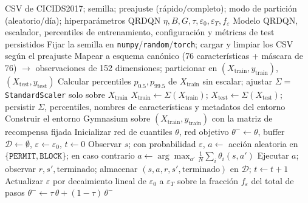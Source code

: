 \begin{algorithm}[htbp]
\caption[Entrenamiento del defensor QRDQN]{Entrenamiento del agente defensor QRDQN sobre CICIDS2017: carga y limpieza de datos, mapeo canónico, partición train/test, ajuste del escalador exclusivamente sobre train, bucle de entrenamiento QRDQN con $\gamma=0$ y persistencia de artefactos. Fuente: elaboración propia a partir de \texttt{src/train\_rl\_defender.py}.}
\label{alg:entrenamiento-qrdqn}
\footnotesize
\begin{algorithmic}[1]
\Require CSV de CICIDS2017; semilla; preajuste (rápido/completo); modo de partición (aleatorio/día); hiperparámetros QRDQN $\eta, B, G, \tau, \varepsilon_0, \varepsilon_T, f_\varepsilon$
\Ensure Modelo QRDQN, escalador, percentiles de entrenamiento, configuración y métricas de test persistidos
\State Fijar la semilla en \texttt{numpy}/\texttt{random}/\texttt{torch}; cargar y limpiar los CSV según el preajuste 
\State Mapear a esquema canónico (76 características + máscara de 76) $\rightarrow$ observaciones de 152 dimensiones; particionar en $(X_{\text{train}},y_{\text{train}})$, $(X_{\text{test}},y_{\text{test}})$
\State Calcular percentiles $p_{0.5}, p_{99.5}$ de $X_{\text{train}}$ sin escalar; ajustar $\Sigma=$\texttt{StandardScaler} solo sobre $X_{\text{train}}$ 
\State $X_{\text{train}} \leftarrow \Sigma(X_{\text{train}})$; $X_{\text{test}} \leftarrow \Sigma(X_{\text{test}})$; persistir $\Sigma$, percentiles, nombres de características y metadatos del entorno
\State Construir el entorno Gymnasium sobre $(X_{\text{train}}, y_{\text{train}})$ con la matriz de recompensa fijada
\State Inicializar red de cuantiles $\theta$, red objetivo $\theta^- \leftarrow \theta$, buffer $\mathcal{D} \leftarrow \emptyset$, $\varepsilon \leftarrow \varepsilon_0$, $t \leftarrow 0$
    \State Observar $s$; con probabilidad $\varepsilon$, $a \leftarrow$ acción aleatoria en $\{\texttt{PERMIT}, \texttt{BLOCK}\}$; en caso contrario $a \leftarrow \arg\max_{a'} \tfrac{1}{N}\sum_{i} \theta_i(s, a')$
    \State Ejecutar $a$; observar $r, s', \text{terminado}$; almacenar $(s, a, r, s', \text{terminado})$ en $\mathcal{D}$; $t \leftarrow t+1$
    \State Actualizar $\varepsilon$ por decaimiento lineal de $\varepsilon_0$ a $\varepsilon_T$ sobre la fracción $f_\varepsilon$ del total de pasos
        \State $\theta^- \leftarrow \tau\,\theta + (1-\tau)\,\theta^-$ 

\end{algorithmic}
\end{algorithm}
